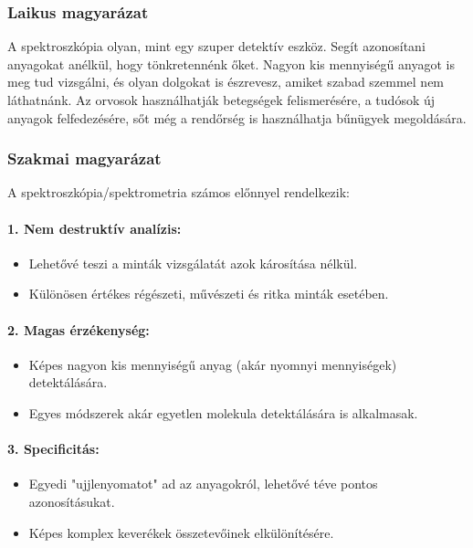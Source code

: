 \documentclass[a4paper,12pt]{article}
\begin{document}
\subsubsection{Laikus magyarázat} A spektroszkópia olyan, mint egy szuper detektív eszköz. Segít azonosítani anyagokat anélkül, hogy tönkretennénk őket. Nagyon kis mennyiségű anyagot is meg tud vizsgálni, és olyan dolgokat is észrevesz, amiket szabad szemmel nem láthatnánk. Az orvosok használhatják betegségek felismerésére, a tudósok új anyagok felfedezésére, sőt még a rendőrség is használhatja bűnügyek megoldására.

\subsubsection{Szakmai magyarázat} A spektroszkópia/spektrometria számos előnnyel rendelkezik:

\paragraph{1. Nem destruktív analízis:} \begin{itemize} \item Lehetővé teszi a minták vizsgálatát azok károsítása nélkül. \item Különösen értékes régészeti, művészeti és ritka minták esetében. \end{itemize}

\paragraph{2. Magas érzékenység:} \begin{itemize} \item Képes nagyon kis mennyiségű anyag (akár nyomnyi mennyiségek) detektálására. \item Egyes módszerek akár egyetlen molekula detektálására is alkalmasak. \end{itemize}

\paragraph{3. Specificitás:} \begin{itemize} \item Egyedi "ujjlenyomatot" ad az anyagokról, lehetővé téve pontos azonosításukat. \item Képes komplex keverékek összetevőinek elkülönítésére. \end{itemize}
\end{document}
